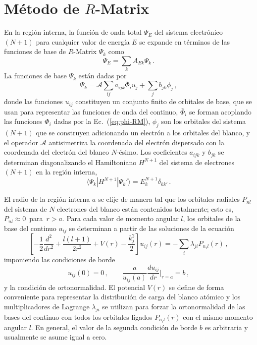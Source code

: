 \chapter{Método de $R$-Matrix}
\label{app:rmatrix}


En la región interna, la función de onda total $\Psi_E$ del sistema 
electrónico $(N+1)$ para cualquier valor de energía $E$ se expande en 
términos de las funciones de base de $R$-Matrix $\Psi_k$ como
\begin{equation}
\Psi_E=\sum_k A_{Ek}\Psi_k\,.
\label{eq:RM-wavefn}
\end{equation}
La funciones de base $\Psi_k$ están dadas por
\begin{equation}
\Psi_k=\mathcal{A}\sum_{ij}a_{ijk}\bar{\Phi}_i u_{j}
+\sum_j b_{jk}\phi_j\,,
\label{eq:RM-basisfn}
\end{equation}
donde las funciones $u_{ij}$ constituyen un conjunto finito de orbitales 
de base, que se usan para representar las funciones de onda del continuo,
$\bar{\Phi}_i$ se forman acoplando las funciones $\Phi_i$ dadas por la 
Ec.~(\ref{eq:phi-RM}), $\phi_j$ son los orbitales del sistema $(N+1)$ 
que se construyen adicionando un electrón a los orbitales del blanco, y 
el operador $\mathcal{A}$ 
antisimetriza la coordenada del electrón dispersado con la coordenada 
del electrón del blanco $N$-ésimo. Los coeficientes $a_{ijk}$ y $b_{jk}$ 
se determinan diagonalizando el Hamiltoniano $H^{N+1}$ del sistema de 
electrones $(N+1)$ en la región interna,
\begin{equation}
\langle\Psi_k\left|H^{N+1}\right|\Psi_k'\rangle=E_k^{N+1}\delta_{kk'}\,.
\label{eq:RM-N+1Hamilt}
\end{equation}

El radio de la región interna $a$ se elije de manera tal que los 
orbitales radiales $P_{nl}$ del sistema de $N$ electrones del blanco 
están contenidos totalmente; esto es, \mbox{$P_{nl}\approx 0$ para 
$r>a$.} Para 
cada valor de momento angular $l$, los orbitales de la base del continuo 
$u_{ij}$ se determinan a partir de las soluciones de la ecuación
\begin{equation}
\left[-\frac{1}{2}\frac{d^2}{dr^2}+\frac{l(l+1)}{2r^2}+V(r)
-\frac{k_j^2}{2}\right]u_{ij}(r)=-\sum_i\lambda_{ji}P_{n_il}(r)\,,
\label{eq:RM-difeq-uj}
\end{equation}
imponiendo las condiciones de borde 
\begin{equation}
u_{ij}(0)=0\,,\qquad\frac{a}{u_{ij}(a)}\frac{du_{ij}}{dr}\bigg|_{r=a}=b\,,
\end{equation}
y la condición de ortonormalidad.
El potencial $V(r)$ se define de forma conveniente para representar la
distribución de carga del blanco atómico y los multiplicadores de 
Lagrange $\lambda_{ji}$ se utilizan para forzar la ortonormalidad de las
bases del continuo con todos los orbitales ligados $P_{n_il}(r)$ con el
mismo momento angular $l$. En general, el valor de la segunda condición 
de borde $b$ es arbitraria y usualmente se asume igual a cero.

